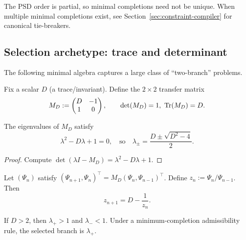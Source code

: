 \begin{remark}
The PSD order is partial, so minimal completions need not be unique.
When multiple minimal completions exist, see
Section~\ref{sec:constraint-compiler} for canonical tie-breakers.
\end{remark}

\subsection{Selection archetype: trace and determinant}

The following minimal algebra captures a large class of ``two-branch'' problems.

\begin{definition}
\label{def:transfer-matrix}
Fix a scalar $D$ (a trace/invariant).
Define the $2\times 2$ transfer matrix
\[
M_D := \begin{pmatrix} D & -1\\ 1 & 0 \end{pmatrix},
\qquad \det(M_D)=1,\ \mathrm{Tr}(M_D)=D.
\]
\end{definition}

\begin{lemma}[Eigenvalues]
\label{lem:eigenvalues}
The eigenvalues of $M_D$ satisfy
\[
\lambda^2 - D\lambda + 1 = 0,
\quad\text{so}\quad
\lambda_\pm = \frac{D\pm \sqrt{D^2-4}}{2}.
\]
\end{lemma}

\begin{proof}
Compute $\det(\lambda I - M_D)=\lambda^2-D\lambda+1$.
\end{proof}

\begin{definition}
\label{def:ratio-iteration}
Let $(\Psi_n)$ satisfy $(\Psi_{n+1},\Psi_n)^\top = M_D(\Psi_n,\Psi_{n-1})^\top$.
Define $z_n:=\Psi_n/\Psi_{n-1}$. Then
\[
z_{n+1} = D - \frac{1}{z_n}.
\]
\end{definition}

\begin{proposition}
\label{prop:branch-selection}
If $D>2$, then $\lambda_+>1$ and $\lambda_-<1$.
Under a minimum-completion admissibility rule, the selected branch is $\lambda_+$.
\end{proposition}

